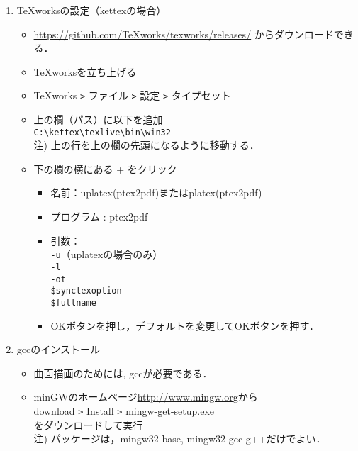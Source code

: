 \documentclass{ujarticle}
\begin{document}
\begin{enumerate}[\bf\large 1.]
\item TeXworksの設定（kettexの場合）
  \begin{itemize}
  \item \url{https://github.com/TeXworks/texworks/releases/} からダウンロードできる．
  \item TeXworksを立ち上げる
  \item TeXworks \verb|>| ファイル \verb|>| 設定 \verb|>| タイプセット
  \item 上の欄（パス）に以下を追加\\
  \hspace*{5mm}\verb|C:\kettex\texlive\bin\win32|\\
  \hspace*{10mm}注) 上の行を上の欄の先頭になるように移動する．
  \item 下の欄の横にある + をクリック
    \begin{itemize}
    \item 名前：uplatex(ptex2pdf)またはplatex(ptex2pdf)
    \item プログラム : ptex2pdf
    \item 引数：\\
    \hspace*{10mm} \verb|-u|（uplatexの場合のみ）\\
    \hspace*{10mm} \verb|-l|\\
    \hspace*{10mm} \verb|-ot|\\
    \hspace*{10mm}  \verb|$synctexoption|\\
    \hspace*{10mm}  \verb|$fullname|
    \item[]OKボタンを押し，デフォルトを変更してOKボタンを押す．
    \end{itemize}
  \end{itemize}
\item gccのインストール
  \begin{itemize}
    \item 曲面描画のためには, gccが必要である．
    \item minGWのホームページ\url{http://www.mingw.org}から\\
    \hspace*{10mm}download \verb|>| Install \verb|>| mingw-get-setup.exe\\
    をダウンロードして実行\\
    \hspace*{10mm}注) パッケージは，mingw32-base, mingw32-gcc-g++だけでよい．
  \end{itemize}


\end{enumerate}
\end{document}
